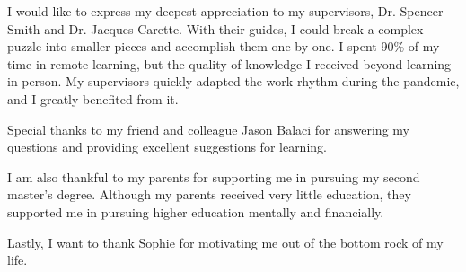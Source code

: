 
I would like to express my deepest appreciation to my supervisors, Dr. Spencer Smith and Dr. Jacques Carette. With their guides, I could break a complex puzzle into smaller pieces and accomplish them one by one. I spent 90\% of my time in remote learning, but the quality of knowledge I received beyond learning in-person. My supervisors quickly adapted the work rhythm during the pandemic, and I greatly benefited from it.

Special thanks to my friend and colleague Jason Balaci for answering my questions and providing excellent suggestions for learning.

I am also thankful to my parents for supporting me in pursuing my second master's degree. Although my parents received very little education, they supported me in pursuing higher education mentally and financially.

Lastly, I want to thank Sophie for motivating me out of the bottom rock of my life. 